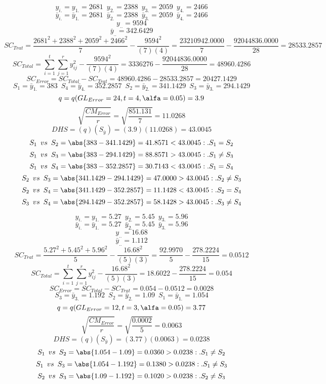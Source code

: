 % 
$$y_{i.}=y_{1.}=2681 \enspace y_{2.}=2388 \enspace y_{3.}=2059 \enspace y_{4.}=2466$$
$$\bar{y}_{i.}=\bar{y}_{1.}=2681 \enspace \bar{y}_{2.}=2388 \enspace \bar{y}_{3.}=2059 \enspace \bar{y}_{4.}=2466$$
$$y_{..}=9594$$
$$\bar{y}_{..}=342.6429$$
$$SC_{Trat}=\frac{2681^{2}+2388^{2}+2059^{2}+2466^{2}}{7}-\frac{9594^{2}}{(7)(4)}=\frac{23210942.0000}{7}-\frac{92044836.0000}{28}=28533.2857$$
$$SC_{Total}=\sum_{i=1}^{\mathit{t}}\sum_{j=1}^{\mathit{r}}y_{ij}^{2}-\frac{9594^{2}}{(7)(4)}=3336276-\frac{92044836.0000}{28}=48960.4286$$
$$SC_{Error}=SC_{Total}-SC_{Trat}=48960.4286-28533.2857=20427.1429$$
$$S_{1}=\bar{y}_{1.}=383 \enspace S_{4}=\bar{y}_{4.}=352.2857 \enspace S_{2}=\bar{y}_{2.}=341.1429 \enspace S_{3}=\bar{y}_{3.}=294.1429$$
$$q=q(GL_{Error}=24, t=4, \alfa=0.05)=3.9$$
$$\sqrt{\frac{CM_{Error}}{r}}=\sqrt{\frac{851.131}{7}}=11.0268$$
$$DHS=(q)(S_{\bar{y}})=(3.9)(11.0268)=43.0045$$
$$S_{1} \enspace vs \enspace S_{2} = \abs{383-341.1429}=41.8571<43.0045:.S_{1}=S_{2}$$
$$S_{1} \enspace vs \enspace S_{3} = \abs{383-294.1429}=88.8571>43.0045:.S_{1}\not=S_{3}$$
$$S_{1} \enspace vs \enspace S_{4} = \abs{383-352.2857}=30.7143<43.0045:.S_{1}=S_{4}$$
$$S_{2} \enspace vs \enspace S_{3} = \abs{341.1429-294.1429}=47.0000>43.0045:.S_{2}\not=S_{3}$$
$$S_{2} \enspace vs \enspace S_{4} = \abs{341.1429-352.2857}=11.1428<43.0045:.S_{2}=S_{4}$$
$$S_{3} \enspace vs \enspace S_{4} = \abs{294.1429-352.2857}=58.1428>43.0045:.S_{3}\not=S_{4}$$

% 
$$y_{i.}=y_{1.}=5.27 \enspace y_{2.}=5.45 \enspace y_{3.}=5.96$$
$$\bar{y}_{i.}=\bar{y}_{1.}=5.27 \enspace \bar{y}_{2.}=5.45 \enspace \bar{y}_{3.}=5.96$$
$$y_{..}=16.68$$
$$\bar{y}_{..}=1.112$$
$$SC_{Trat}=\frac{5.27^{2}+5.45^{2}+5.96^{2}}{5}-\frac{16.68^{2}}{(5)(3)}=\frac{92.9970}{5}-\frac{278.2224}{15}=0.0512$$
$$SC_{Total}=\sum_{i=1}^{\mathit{t}}\sum_{j=1}^{\mathit{r}}y_{ij}^{2}-\frac{16.68^{2}}{(5)(3)}=18.6022-\frac{278.2224}{15}=0.054$$
$$SC_{Error}=SC_{Total}-SC_{Trat}=0.054-0.0512=0.0028$$
$$S_{3}=\bar{y}_{3.}=1.192 \enspace S_{2}=\bar{y}_{2.}=1.09 \enspace S_{1}=\bar{y}_{1.}=1.054$$
$$q=q(GL_{Error}=12, t=3, \alfa=0.05)=3.77$$
$$\sqrt{\frac{CM_{Error}}{r}}=\sqrt{\frac{0.0002}{5}}=0.0063$$
$$DHS=(q)(S_{\bar{y}})=(3.77)(0.0063)=0.0238$$
$$S_{1} \enspace vs \enspace S_{2} = \abs{1.054-1.09}=0.0360>0.0238:.S_{1}\not=S_{2}$$
$$S_{1} \enspace vs \enspace S_{3} = \abs{1.054-1.192}=0.1380>0.0238:.S_{1}\not=S_{3}$$
$$S_{2} \enspace vs \enspace S_{3} = \abs{1.09-1.192}=0.1020>0.0238:.S_{2}\not=S_{3}$$

